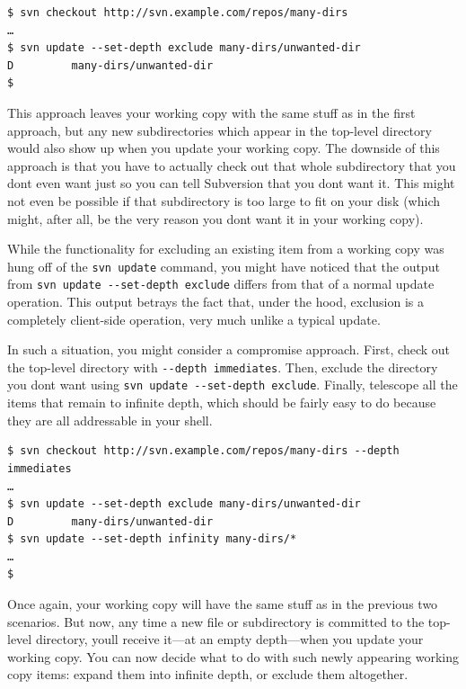 \begin{verbatim}
$ svn checkout http://svn.example.com/repos/many-dirs
…
$ svn update --set-depth exclude many-dirs/unwanted-dir
D         many-dirs/unwanted-dir
$
\end{verbatim}

This approach leaves your working copy with the same stuff as in the
first approach, but any new subdirectories which appear in the top-level
directory would also show up when you update your working copy. The
downside of this approach is that you have to actually check out that
whole subdirectory that you don\textquotesingle t even want just so you
can tell Subversion that you don\textquotesingle t want it. This might
not even be possible if that subdirectory is too large to fit on your
disk (which might, after all, be the very reason you
don\textquotesingle t want it in your working copy).

While the functionality for excluding an existing item from a working
copy was hung off of the \texttt{svn\ update} command, you might have
noticed that the output from
\texttt{svn\ update\ -\/-set-depth\ exclude} differs from that of a
normal update operation. This output betrays the fact that, under the
hood, exclusion is a completely client-side operation, very much unlike
a typical update.

In such a situation, you might consider a compromise approach. First,
check out the top-level directory with \texttt{-\/-depth\ immediates}.
Then, exclude the directory you don\textquotesingle t want using
\texttt{svn\ update\ -\/-set-depth\ exclude}. Finally, telescope all the
items that remain to infinite depth, which should be fairly easy to do
because they are all addressable in your shell.

\begin{verbatim}
$ svn checkout http://svn.example.com/repos/many-dirs --depth immediates
…
$ svn update --set-depth exclude many-dirs/unwanted-dir
D         many-dirs/unwanted-dir
$ svn update --set-depth infinity many-dirs/*
…
$
\end{verbatim}

Once again, your working copy will have the same stuff as in the
previous two scenarios. But now, any time a new file or subdirectory is
committed to the top-level directory, you\textquotesingle ll receive
it---at an empty depth---when you update your working copy. You can now
decide what to do with such newly appearing working copy items: expand
them into infinite depth, or exclude them altogether.

